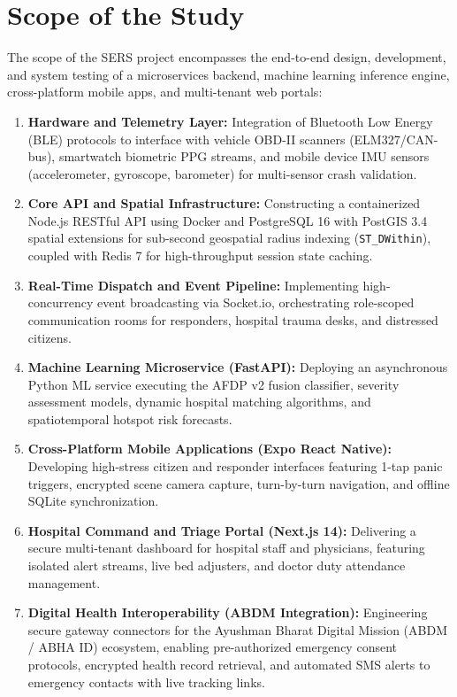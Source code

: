 \documentclass[12pt,a4paper]{article}
\begin{document}
\clearpage
\section{Scope of the Study}
The scope of the SERS project encompasses the end-to-end design, development, and system testing of a microservices backend, machine learning inference engine, cross-platform mobile apps, and multi-tenant web portals:

\begin{enumerate}
    \item \textbf{Hardware and Telemetry Layer:} Integration of Bluetooth Low Energy (BLE) protocols to interface with vehicle OBD-II scanners (ELM327/CAN-bus), smartwatch biometric PPG streams, and mobile device IMU sensors (accelerometer, gyroscope, barometer) for multi-sensor crash validation.
    \item \textbf{Core API and Spatial Infrastructure:} Constructing a containerized Node.js RESTful API using Docker and PostgreSQL 16 with PostGIS 3.4 spatial extensions for sub-second geospatial radius indexing (\texttt{ST\_DWithin}), coupled with Redis 7 for high-throughput session state caching.
    \item \textbf{Real-Time Dispatch and Event Pipeline:} Implementing high-concurrency event broadcasting via Socket.io, orchestrating role-scoped communication rooms for responders, hospital trauma desks, and distressed citizens.
    \item \textbf{Machine Learning Microservice (FastAPI):} Deploying an asynchronous Python ML service executing the AFDP v2 fusion classifier, severity assessment models, dynamic hospital matching algorithms, and spatiotemporal hotspot risk forecasts.
    \item \textbf{Cross-Platform Mobile Applications (Expo React Native):} Developing high-stress citizen and responder interfaces featuring 1-tap panic triggers, encrypted scene camera capture, turn-by-turn navigation, and offline SQLite synchronization.
    \item \textbf{Hospital Command and Triage Portal (Next.js 14):} Delivering a secure multi-tenant dashboard for hospital staff and physicians, featuring isolated alert streams, live bed adjusters, and doctor duty attendance management.
    \item \textbf{Digital Health Interoperability (ABDM Integration):} Engineering secure gateway connectors for the Ayushman Bharat Digital Mission (ABDM / ABHA ID) ecosystem, enabling pre-authorized emergency consent protocols, encrypted health record retrieval, and automated SMS alerts to emergency contacts with live tracking links.
\end{enumerate}
\end{document}
